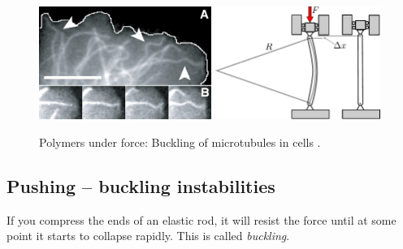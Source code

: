 \begin{figure}[tb]
	\centering
	\includegraphics[width=0.5\textwidth]{figures/Brangwynne_microtubule_buckling.jpg}
	\includegraphics[width=0.48\textwidth]{figures/buckling.pdf}
	\caption{Polymers under force: Buckling of microtubules in cells \citep{brangwynne_microtubules_2006}.}
	\label{fig:buckling}
\end{figure}

\subsection*{Pushing -- buckling instabilities }
If you compress the ends of an elastic rod, it will resist the force until at some point it starts to collapse rapidly.
This is called \emph{buckling}.

